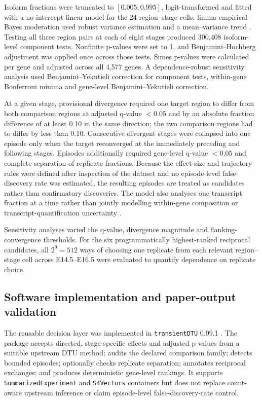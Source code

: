 \documentclass[11pt,a4paper]{article}
\begin{document}
Isoform fractions were truncated to $[0.005,0.995]$, logit-transformed and fitted with a no-intercept linear model for the 24 region--stage cells. limma empirical-Bayes moderation used robust variance estimation and a mean--variance trend \citep{ritchie_limma_2015}. Testing all three region pairs at each of eight stages produced 300,408 isoform-level component tests. Nonfinite p-values were set to 1, and Benjamini--Hochberg adjustment was applied once across those tests. Simes p-values were calculated per gene and adjusted across all 4,577 genes. A dependence-robust sensitivity analysis used Benjamini--Yekutieli correction for component tests, within-gene Bonferroni minima and gene-level Benjamini--Yekutieli correction.

At a given stage, provisional divergence required one target region to differ from both comparison regions at adjusted q-value $<0.05$ and by an absolute fraction difference of at least 0.10 in the same direction; the two comparison regions had to differ by less than 0.10. Consecutive divergent stages were collapsed into one episode only when the target reconverged at the immediately preceding and following stages. Episodes additionally required gene-level q-value $<0.05$ and complete separation of replicate fractions. Because the effect-size and trajectory rules were defined after inspection of the dataset and no episode-level false-discovery rate was estimated, the resulting episodes are treated as candidates rather than confirmatory discoveries. The model also analyses one transcript fraction at a time rather than jointly modelling within-gene composition or transcript-quantification uncertainty \citep{soneson_dtu_2016,nowicka_drimseq_2016,van_den_berge_stager_2017,love_swimming_2018}.

Sensitivity analyses varied the q-value, divergence magnitude and flanking-convergence thresholds. For the six programmatically highest-ranked reciprocal candidates, all $2^9=512$ ways of choosing one replicate from each relevant region--stage cell across E14.5--E16.5 were evaluated to quantify dependence on replicate choice.

\subsection{Software implementation and paper-output validation}

The reusable decision layer was implemented in \texttt{transientDTU} 0.99.1 \citep{gounder_transientdtu_2026}. The package accepts directed, stage-specific effects and adjusted p-values from a suitable upstream DTU method; audits the declared comparison family; detects bounded episodes; optionally checks replicate separation; annotates reciprocal exchanges; and produces deterministic gene-level rankings. It supports \texttt{SummarizedExperiment} and \texttt{S4Vectors} containers but does not replace count-aware upstream inference or claim episode-level false-discovery-rate control.
\end{document}
